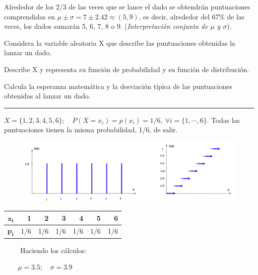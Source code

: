 \vspace{2mm} Alrededor de los 2/3 de las veces que se lance el dado se obtendrán puntuaciones comprendidas en $\mu \pm \sigma=7\pm 2.42 \approx (5,9)$, es decir, alrededor del 67\% de las veces, los dados sumarán 5, 6, 7, 8 o 9. (\emph{Interpretación conjunta de $\mu$ y $\sigma$}).


\vspace{4mm}
\begin{ejemplo}
	\begin{ejre}
	Considera la variable aleatoria X que describe las puntuaciones obtenidas la lanzar un dado.
	
	\vspace{2mm} Describe X y representa su función de probabilidad y su función de distribución. 
	
	\vspace{2mm} Calcula la esperanza matemática y la desviación típica de las puntuaciones obtenidas al lanzar un dado.
	
	\rule{100pt}{0.1pt}
	
	$X=\{1,2,3,4,5,6\}; \quad P(X=x_i)=p(x_i)=1/6,\ \forall i=\{1,\cdots, 6\}$. Todas las puntuaciones tienen la misma probabilidad, 1/6, de salir.
	
	\begin{figure}[H]
	\centering
	\includegraphics[width=.95\textwidth]{imagenes/imagenes04/T04IM06.png}
	\end{figure}
	
	\begin{multicols}{2}
	\begin{table}[H]
	\small
	\centering
	\begin{tabular}{r|rrrrrr}
	$\boldsymbol{x_i}$ & 1 & 2 & 3 & 4 & 5 & 6 \\ \hline
	$\boldsymbol{p_i}$ & 1/6 & 1/6 & 1/6 & 1/6 & 1/6 & 1/6
	\end{tabular}
	\end{table}

	$\qquad$ Haciendo los cálculos: 
	
	$\qquad \mu=3.5;\quad \sigma=3.9$
	\end{multicols}
	\end{ejre}
\end{ejemplo}

